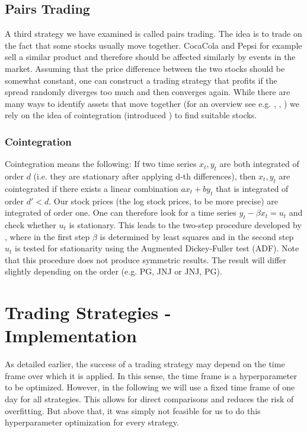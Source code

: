\subsection{Pairs Trading}
A third strategy we have examined is called pairs trading. The idea is to trade on the fact that some stocks usually move together. CocaCola and Pepsi for example sell a similar product and therefore should be affected similarly by events in the market. Assuming that the price difference between the two stocks should be somewhat constant, one can construct a trading strategy that profits if the spread randomly diverges too much and then converges again. While there are many ways to identify assets that move together (for an overview see e.g. \cite{gatev_pairs_1999}, \cite{ganapathy_vidyamurthy_pairs_2004}, \cite{do_new_2006}) we rely on the idea of cointegration (introduced \cite{engle_co-integration_1987}) to find suitable stocks. 

\subsubsection{Cointegration}
Cointegration means the following: If two time series $x_t, y_t$ are both integrated of order $d$ (i.e. they are stationary after applying d-th differences), then $x_t, y_t$ are cointegrated if there exists a linear combination $a x_t + b y_t$ that is integrated of order $d' < d$. Our stock prices (the log stock prices, to be more precise) are integrated of order one. One can therefore look for a time series  $y_t - \beta x_t = u_t$ and check whether $u_t$ is stationary. This leads to the two-step procedure developed by \cite{engle_co-integration_1987}, where in the first step $\beta$ is determined by least squares and in the second step $u_t$ is tested for stationarity using the Augmented Dickey-Fuller test (ADF). Note that this procedure does not produce symmetric results. The result will differ slightly depending on the order (e.g. PG, JNJ or JNJ, PG). 

\section{Trading Strategies - Implementation}
As detailed earlier, the success of a trading strategy may depend on the time frame over which it is applied. In this sense, the time frame is a hyperparameter to be optimized. However, in the following we will use a fixed time frame of one day for all strategies. This allows for direct comparisons and reduces the risk of overfitting. But above that, it was simply not feasible for us to do this hyperparameter optimization for every strategy. 

